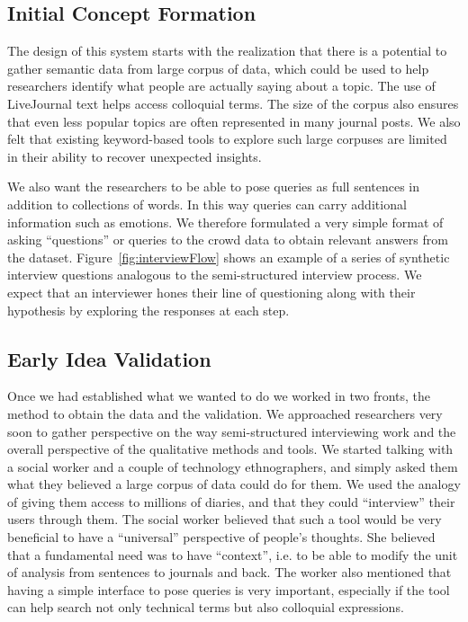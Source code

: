 \documentclass{sigchi}
\begin{document}
\subsection{Initial Concept Formation}
The design of this system starts with the realization that there is a potential to gather semantic data from large corpus of data, which could be used to help researchers identify what people are actually saying about a topic. The use of LiveJournal text helps access colloquial terms. The size of the corpus also ensures that even less popular topics are often represented in many journal posts. 
 We also felt that existing keyword-based tools to explore such large corpuses are limited in their ability to recover unexpected insights.

We also want the researchers to be able to pose queries as full sentences in addition to collections of words. In this way queries can carry additional information such as emotions. We therefore formulated a very simple format of asking ``questions'' or queries to the crowd data to obtain relevant answers from the dataset. Figure~\ref{fig:interviewFlow} shows an example of a series of synthetic interview questions analogous to the semi-structured interview process. We expect that an interviewer hones their line of questioning along with their hypothesis by exploring the responses at each step. 
\subsection{Early Idea Validation}

Once we had established what we wanted to do we worked in two fronts, the method to obtain the data and the validation. We approached researchers very soon to gather perspective on the way semi-structured interviewing work and the overall perspective of the qualitative methods and tools. We started talking with a social worker and a couple of technology ethnographers, and simply asked them what they believed a large corpus of data could do for them. We used the analogy of giving them access to millions of diaries, and that they could ``interview'' their users through them. The social worker believed that such a tool would be very beneficial to have a ``universal'' perspective of people's thoughts. She believed that a fundamental need was to have ``context'', i.e. to be able to modify the unit of analysis from sentences to journals and back. The worker also mentioned that having a simple interface to pose queries is very important, especially if the tool can help search not only technical terms but also colloquial expressions. 
\end{document}

